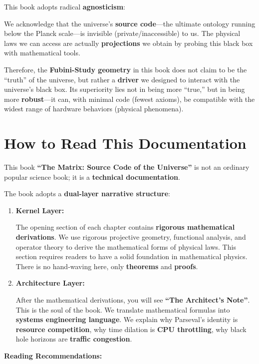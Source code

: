 \documentclass[11pt,a4paper,twoside]{book}
\begin{document}
This book adopts radical \textbf{agnosticism}:

We acknowledge that the universe's \textbf{source code}---the ultimate ontology running below the Planck scale---is invisible (private/inaccessible) to us. The physical laws we can access are actually \textbf{projections} we obtain by probing this black box with mathematical tools.

Therefore, the \textbf{Fubini-Study geometry} in this book does not claim to be the ``truth'' of the universe, but rather a \textbf{driver} we designed to interact with the universe's black box. Its superiority lies not in being more ``true,'' but in being more \textbf{robust}---it can, with minimal code (fewest axioms), be compatible with the widest range of hardware behaviors (physical phenomena).

\section{How to Read This Documentation}

This book \textbf{``The Matrix: Source Code of the Universe''} is not an ordinary popular science book; it is a \textbf{technical documentation}.

The book adopts a \textbf{dual-layer narrative structure}:

\begin{enumerate}
\item \textbf{Kernel Layer:}

   The opening section of each chapter contains \textbf{rigorous mathematical derivations}. We use rigorous projective geometry, functional analysis, and operator theory to derive the mathematical forms of physical laws. This section requires readers to have a solid foundation in mathematical physics. There is no hand-waving here, only \textbf{theorems} and \textbf{proofs}.

\item \textbf{Architecture Layer:}

   After the mathematical derivations, you will see \textbf{``The Architect's Note''}. This is the soul of the book. We translate mathematical formulas into \textbf{systems engineering language}. We explain why Parseval's identity is \textbf{resource competition}, why time dilation is \textbf{CPU throttling}, why black hole horizons are \textbf{traffic congestion}.
\end{enumerate}

\textbf{Reading Recommendations:}
\end{document}
